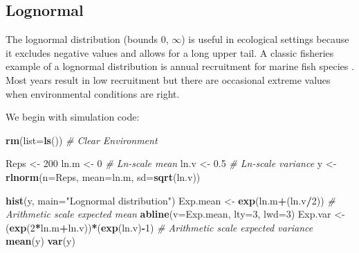 \documentclass[
]{krantz}
\makeatletter
\newenvironment{Shaded}{\begin{snugshade}}{\end{snugshade}}
\newcommand{\AttributeTok}[1]{\textcolor[rgb]{0.27,0.27,0.27}{#1}}
\newcommand{\CommentTok}[1]{\textcolor[rgb]{0.37,0.37,0.37}{\textit{#1}}}
\newcommand{\DecValTok}[1]{\textcolor[rgb]{0.06,0.06,0.06}{#1}}
\newcommand{\FloatTok}[1]{\textcolor[rgb]{0.06,0.06,0.06}{#1}}
\newcommand{\FunctionTok}[1]{\textcolor[rgb]{0.27,0.27,0.27}{\textbf{#1}}}
\newcommand{\NormalTok}[1]{#1}
\newcommand{\OtherTok}[1]{\textcolor[rgb]{0.37,0.37,0.37}{#1}}
\newcommand{\SpecialCharTok}[1]{\textcolor[rgb]{0.43,0.43,0.43}{\textbf{#1}}}
\newcommand{\StringTok}[1]{\textcolor[rgb]{0.5,0.5,0.5}{#1}}
\newenvironment{kframe}{%
\medskip{}
\setlength{\fboxsep}{.8em}
 \def\at@end@of@kframe{}%
 \ifinner\ifhmode%
  \def\at@end@of@kframe{\end{minipage}}%
  \begin{minipage}{\columnwidth}%
 \fi\fi%
 \def\FrameCommand##1{\hskip\@totalleftmargin \hskip-\fboxsep
 \colorbox{shadecolor}{##1}\hskip-\fboxsep
     \hskip-\linewidth \hskip-\@totalleftmargin \hskip\columnwidth}%
 \MakeFramed {\advance\hsize-\width
   \@totalleftmargin\z@ \linewidth\hsize
   \@setminipage}}%
 {\par\unskip\endMakeFramed%
 \at@end@of@kframe}
\renewenvironment{Shaded}{\begin{kframe}}{\end{kframe}}
\makeatother
\begin{document}
\hypertarget{LognormalDist}{%
\subsection{Lognormal}\label{LognormalDist}}

The lognormal distribution (bounds 0, \(\infty\)) is useful in ecological settings because it excludes negative values and allows for a long upper tail. A classic fisheries example of a lognormal distribution is annual recruitment for marine fish species \citep{hilborn.walters_1992}. Most years result in low recruitment but there are occasional extreme values when environmental conditions are right.

We begin with simulation code:

\begin{Shaded}
\begin{Highlighting}[]
\FunctionTok{rm}\NormalTok{(}\AttributeTok{list=}\FunctionTok{ls}\NormalTok{()) }\CommentTok{\# Clear Environment}

\NormalTok{Reps }\OtherTok{\textless{}{-}} \DecValTok{200}
\NormalTok{ln.m }\OtherTok{\textless{}{-}} \DecValTok{0} \CommentTok{\# Ln{-}scale mean}
\NormalTok{ln.v }\OtherTok{\textless{}{-}} \FloatTok{0.5} \CommentTok{\# Ln{-}scale variance}
\NormalTok{y }\OtherTok{\textless{}{-}} \FunctionTok{rlnorm}\NormalTok{(}\AttributeTok{n=}\NormalTok{Reps, }\AttributeTok{mean=}\NormalTok{ln.m, }\AttributeTok{sd=}\FunctionTok{sqrt}\NormalTok{(ln.v))}

\FunctionTok{hist}\NormalTok{(y, }\AttributeTok{main=}\StringTok{"Lognormal distribution"}\NormalTok{)}
\NormalTok{Exp.mean }\OtherTok{\textless{}{-}} \FunctionTok{exp}\NormalTok{(ln.m}\SpecialCharTok{+}\NormalTok{(ln.v}\SpecialCharTok{/}\DecValTok{2}\NormalTok{)) }\CommentTok{\# Arithmetic scale expected mean}
\FunctionTok{abline}\NormalTok{(}\AttributeTok{v=}\NormalTok{Exp.mean, }\AttributeTok{lty=}\DecValTok{3}\NormalTok{, }\AttributeTok{lwd=}\DecValTok{3}\NormalTok{)}
\NormalTok{Exp.var }\OtherTok{\textless{}{-}}\NormalTok{ (}\FunctionTok{exp}\NormalTok{(}\DecValTok{2}\SpecialCharTok{*}\NormalTok{ln.m}\SpecialCharTok{+}\NormalTok{ln.v))}\SpecialCharTok{*}\NormalTok{(}\FunctionTok{exp}\NormalTok{(ln.v)}\SpecialCharTok{{-}}\DecValTok{1}\NormalTok{) }
  \CommentTok{\# Arithmetic scale expected variance}
\FunctionTok{mean}\NormalTok{(y)}
\FunctionTok{var}\NormalTok{(y)}
\end{Highlighting}
\end{Shaded}
\end{document}
